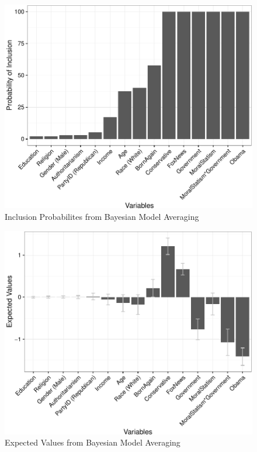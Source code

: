 \documentclass[12pt,]{article}
\begin{document}
\begin{figure}[htbp]
\centering
\includegraphics{figures/bma2-1.pdf}
\caption{Inclusion Probabilites from Bayesian Model Averaging}
\end{figure}

\clearpage

\begin{figure}[htbp]
\centering
\includegraphics{figures/bma3-1.pdf}
\caption{Expected Values from Bayesian Model Averaging}
\end{figure}
\end{document}
